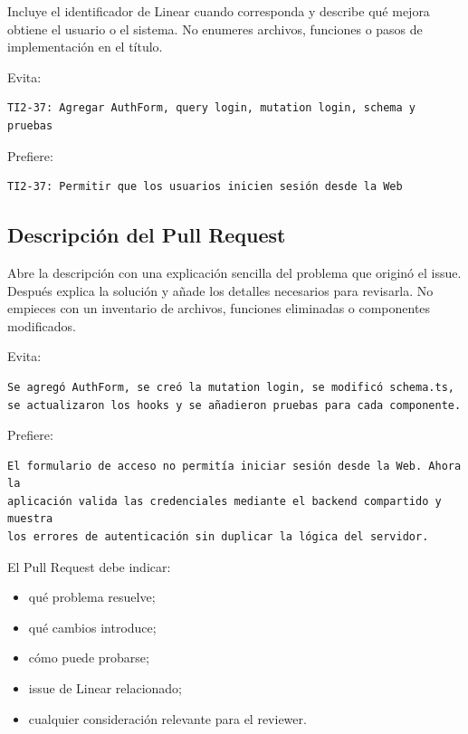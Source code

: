 \documentclass[11pt,a4paper]{article}
\begin{document}
Incluye el identificador de Linear cuando corresponda y describe qué mejora
obtiene el usuario o el sistema. No enumeres archivos, funciones o pasos de
implementación en el título.

Evita:

\begin{lstlisting}
TI2-37: Agregar AuthForm, query login, mutation login, schema y pruebas
\end{lstlisting}

Prefiere:

\begin{lstlisting}
TI2-37: Permitir que los usuarios inicien sesión desde la Web
\end{lstlisting}

\subsection{Descripción del Pull Request}

Abre la descripción con una explicación sencilla del problema que originó el
issue. Después explica la solución y añade los detalles necesarios para
revisarla. No empieces con un inventario de archivos, funciones eliminadas o
componentes modificados.

Evita:

\begin{lstlisting}
Se agregó AuthForm, se creó la mutation login, se modificó schema.ts,
se actualizaron los hooks y se añadieron pruebas para cada componente.
\end{lstlisting}

Prefiere:

\begin{lstlisting}
El formulario de acceso no permitía iniciar sesión desde la Web. Ahora la
aplicación valida las credenciales mediante el backend compartido y muestra
los errores de autenticación sin duplicar la lógica del servidor.
\end{lstlisting}

El Pull Request debe indicar:

\begin{itemize}
  \item qué problema resuelve;
  \item qué cambios introduce;
  \item cómo puede probarse;
  \item issue de Linear relacionado;
  \item cualquier consideración relevante para el reviewer.
\end{itemize}
\end{document}
